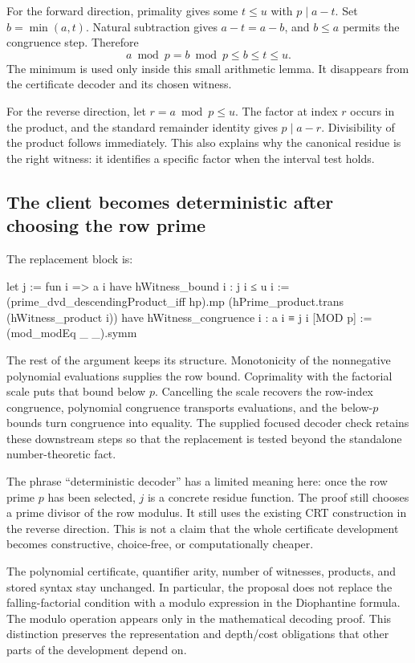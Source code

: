 For the forward direction, primality gives some $t\le u$ with $p\mid a-t$. Set $b=\min(a,t)$. Natural subtraction gives $a-t=a-b$, and $b\le a$ permits the congruence step. Therefore
\[
 a\bmod p=b\bmod p\le b\le t\le u.
\]
The minimum is used only inside this small arithmetic lemma. It disappears from the certificate decoder and its chosen witness.

For the reverse direction, let $r=a\bmod p\le u$. The factor at index $r$ occurs in the product, and the standard remainder identity gives $p\mid a-r$. Divisibility of the product follows immediately. This also explains why the canonical residue is the right witness: it identifies a specific factor when the interval test holds.

\subsection{The client becomes deterministic after choosing the row prime}
The replacement block is:
\begin{lean}
let j := fun i => a i %
have hWitness_bound i : j i ≤ u i :=
  (prime_dvd_descendingProduct_iff hp).mp
    (hPrime_product.trans (hWitness_product i))
have hWitness_congruence i : a i ≡ j i [MOD p] :=
  (mod_modEq _ _).symm
\end{lean}

The rest of the argument keeps its structure. Monotonicity of the nonnegative polynomial evaluations supplies the row bound. Coprimality with the factorial scale puts that bound below $p$. Cancelling the scale recovers the row-index congruence, polynomial congruence transports evaluations, and the below-$p$ bounds turn congruence into equality. The supplied focused decoder check retains these downstream steps so that the replacement is tested beyond the standalone number-theoretic fact.

The phrase ``deterministic decoder'' has a limited meaning here: once the row prime $p$ has been selected, $j$ is a concrete residue function. The proof still chooses a prime divisor of the row modulus. It still uses the existing CRT construction in the reverse direction. This is not a claim that the whole certificate development becomes constructive, choice-free, or computationally cheaper.

The polynomial certificate, quantifier arity, number of witnesses, products, and stored syntax stay unchanged. In particular, the proposal does not replace the falling-factorial condition with a modulo expression in the Diophantine formula. The modulo operation appears only in the mathematical decoding proof. This distinction preserves the representation and depth/cost obligations that other parts of the development depend on.

